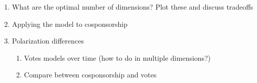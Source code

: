 \documentclass[11pt,]{article}
\providecommand{\tightlist}{%
\setlength{\itemsep}{0pt}\setlength{\parskip}{0pt}}
\begin{document}
\begin{enumerate}
  \begin{enumerate}
  \def\labelenumii{\alph{enumii}.}
  \tightlist
  \item
    What are the optimal number of dimensions? Plot these and discuss
    tradeoffs
  \item
    Applying the model to cosponsorship
  \item
    Polarization differences

    \begin{enumerate}
    \def\labelenumiii{\roman{enumiii}.}
    \tightlist
    \item
      Votes models over time (how to do in multiple dimensions?)
    \item
      Compare between cosponsorship and votes
    \end{enumerate}
  \end{enumerate}
\end{enumerate}




\newpage
\singlespacing 
\end{document}
